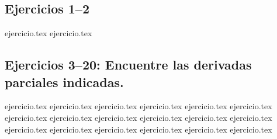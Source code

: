 
\subsection*{Ejercicios 1--2}
\begin{enumerate}
    {ejercicio.tex}
    {ejercicio.tex}
\end{enumerate}

\subsection*{Ejercicios 3--20: Encuentre las derivadas parciales indicadas.}
\begin{enumerate}
    \setcounter{enumi}{2}
    {ejercicio.tex}
    {ejercicio.tex}
    {ejercicio.tex}
    {ejercicio.tex}
    {ejercicio.tex}
    {ejercicio.tex}
    {ejercicio.tex}
    {ejercicio.tex}
    {ejercicio.tex}
    {ejercicio.tex}
    {ejercicio.tex}
    {ejercicio.tex}
    {ejercicio.tex}
    {ejercicio.tex}
    {ejercicio.tex}
    {ejercicio.tex}
    {ejercicio.tex}
    {ejercicio.tex}
\end{enumerate}

